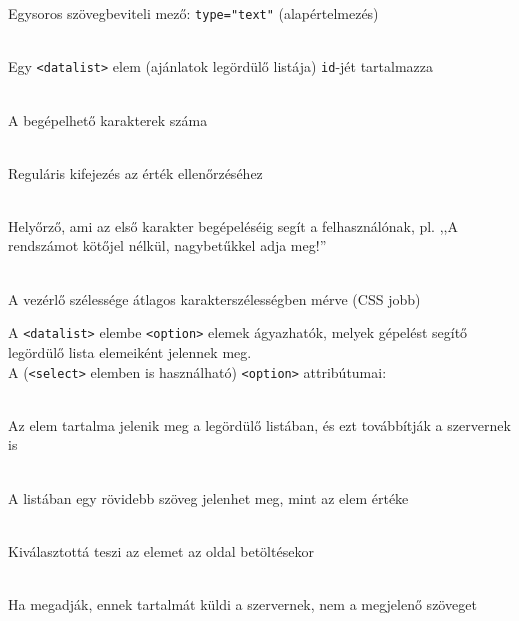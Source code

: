 \begin{frame}
  Egysoros szövegbeviteli mező: \texttt{type="text"} (alapértelmezés)
  \begin{description}[m]
    \item[\texttt{list}] \hfill \\ Egy \texttt{<datalist>} elem (ajánlatok legördülő listája) \texttt{id}-jét tartalmazza
    \item[\texttt{maxlength}] \hfill \\ A begépelhető karakterek száma
    \item[\texttt{pattern}] \hfill \\ Reguláris kifejezés az érték ellenőrzéséhez
    \item[\texttt{placeholder}] \hfill \\ Helyőrző, ami az első karakter begépeléséig segít a felhasználónak, pl. ,,A rendszámot kötőjel nélkül, nagybetűkkel adja meg!''
    \item[\texttt{size}] \hfill \\ A vezérlő szélessége átlagos karakterszélességben mérve (CSS jobb)
  \end{description}
\end{frame}

\begin{frame}
  A \texttt{<datalist>} elembe \texttt{<option>} elemek ágyazhatók, 
  melyek gépelést segítő legördülő lista elemeiként jelennek meg.\\
  A (\texttt{<select>} elemben is használható) \texttt{<option>} attribútumai:
  \begin{description}[m]
    \item[\emph{attribútum nélkül}] \hfill \\ Az elem tartalma jelenik meg a legördülő listában, és ezt továbbítják a szervernek is
    \item[\texttt{label}] \hfill \\ A listában egy rövidebb szöveg jelenhet meg, mint az elem értéke
    \item[\texttt{selected}] \hfill \\ Kiválasztottá teszi az elemet az oldal betöltésekor
    \item[\texttt{value}] \hfill \\ Ha megadják, ennek tartalmát küldi a szervernek, nem a megjelenő szöveget
  \end{description}
\end{frame}

